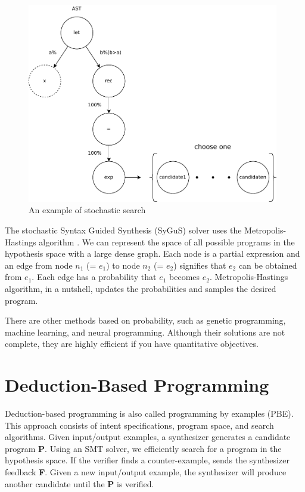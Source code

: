 \documentclass[12pt, a4paper, titlepage]{report}
\begin{document}
    \begin{figure}[htbp]
      \centering
      \includegraphics[width=11cm]{images/stochastic.pdf}
      \caption{An example of stochastic search}
      \label{stochastic}
    \end{figure}

    The stochastic Syntax Guided Synthesis (SyGuS) solver uses the Metropolis-Hastings algorithm \cite{alur:2013}.
    We can represent the space of all possible programs in the hypothesis space with a large dense graph.
    Each node is a partial expression and an edge from node $n_1$ (= $e_1$) to node $n_2$ (= $e_2$) signifies that $e_2$ can be obtained from $e_1$.
    Each edge has a probability that $e_1$ becomes $e_2$.
    Metropolis-Hastings algorithm, in a nutshell, updates the probabilities and samples the desired program.

    There are other methods based on probability, such as genetic programming, machine learning, and neural programming.
    Although their solutions are not complete, they are highly efficient if you have quantitative objectives.

  \section{Deduction-Based Programming}
    Deduction-based programming is also called programming by examples (PBE).
    This approach consists of intent specifications, program space, and search algorithms.
    Given input/output examples, a synthesizer generates a candidate program \textbf{P}.
    Using an SMT solver, we efficiently search for a program in the hypothesis space.
    If the verifier finds a counter-example, sends the synthesizer feedback \textbf{F}.
    Given a new input/output example, the synthesizer will produce another candidate until the \textbf{P} is verified.
\end{document}
